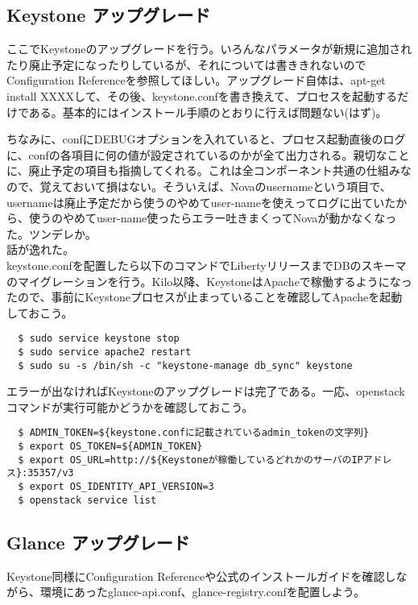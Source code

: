 \documentclass[9pt,b5paper,tombo,openany]{jsbook}
\begin{document}
\subsection{Keystone アップグレード}
ここでKeystoneのアップグレードを行う。いろんなパラメータが新規に追加されたり廃止予定になったりしているが、それについては書ききれないのでConfiguration Referenceを参照してほしい。アップグレード自体は、apt-get install XXXXして、その後、keystone.confを書き換えて、プロセスを起動するだけである。基本的にはインストール手順のとおりに行えば問題ない(はず)。

ちなみに、confにDEBUGオプションを入れていると、プロセス起動直後のログに、confの各項目に何の値が設定されているのかが全て出力される。親切なことに、廃止予定の項目も指摘してくれる。これは全コンポーネント共通の仕組みなので、覚えておいて損はない。そういえば、Novaのusernameという項目で、usernameは廃止予定だから使うのやめてuser-nameを使えってログに出ていたから、使うのやめてuser-name使ったらエラー吐きまくってNovaが動かなくなった。ツンデレか。\\[1ex]

話が逸れた。\\[1ex]


keystone.confを配置したら以下のコマンドでLibertyリリースまでDBのスキーマのマイグレーションを行う。Kilo以降、KeystoneはApacheで稼働するようになったので、事前にKeystoneプロセスが止まっていることを確認してApacheを起動しておこう。

\begin{lstlisting}
  $ sudo service keystone stop
  $ sudo service apache2 restart
  $ sudo su -s /bin/sh -c "keystone-manage db_sync" keystone
\end{lstlisting}

エラーが出なければKeystoneのアップグレードは完了である。一応、openstackコマンドが実行可能かどうかを確認しておこう。

\begin{lstlisting}
  $ ADMIN_TOKEN=${keystone.confに記載されているadmin_tokenの文字列}
  $ export OS_TOKEN=${ADMIN_TOKEN}
  $ export OS_URL=http://${Keystoneが稼働しているどれかのサーバのIPアドレス}:35357/v3
  $ export OS_IDENTITY_API_VERSION=3
  $ openstack service list
\end{lstlisting}

\subsection{Glance アップグレード}
Keystone同様にConfiguration Referenceや公式のインストールガイドを確認しながら、環境にあったglance-api.conf、glance-registry.confを配置しよう。\\[1ex]
\end{document}
